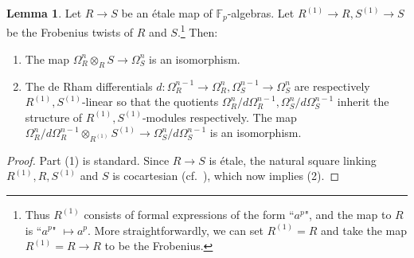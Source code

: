 \documentclass{amsart}
\theoremstyle{definition}
\newtheorem{lemma}[definition]{Lemma}
\begin{document}
\begin{lemma} 
Let $R \to S$ be an \'etale map of $\mathbb{F}_p$-algebras. 
Let $R^{(1)} \rightarrow R, S^{(1)} \rightarrow S$ be the Frobenius twists of $R$ and $S$.\footnote{Thus $R^{(1)}$ consists of formal expressions of the form ``$a^p$", and the map to $R$ is ``$a^p$" $\mapsto a^p$.  More straightforwardly, we can set $R^{(1)}=R$ and take the map $R^{(1)}=R\rightarrow R$ to be the Frobenius.}
Then: 
\begin{enumerate}
\item The map $\Omega^n_R \otimes_R S \to \Omega^n_S$ is an isomorphism.  
\item The 
de Rham differentials $d: \Omega^{n-1}_R \to \Omega^n_R, \Omega^{n-1}_S \to
\Omega^n_S$ are respectively $R^{(1)}, S^{(1)}$-linear so that the quotients 
$\Omega^n_R/d \Omega_R^{n-1} , \Omega^n_S/d \Omega_S^{n-1} $ inherit the
structure of $R^{(1)}, S^{(1)}$-modules respectively.
The 
map $\Omega^n_R/d \Omega_R^{n-1} \otimes_{R^{(1)}} S^{(1)} \to
\Omega^n_S/d\Omega^{n-1}_S$ is an isomorphism. 
\end{enumerate}
\label{qcohomega}
\end{lemma} 
\begin{proof} 
Part (1) is standard. Since $R \to S$ is \'etale, the natural square linking
$R^{(1)}, R, S^{(1)}$ and $S$ is cocartesian (cf.~\cite[Tag
0EBS]{stacks-project}), which now implies
(2). 
\end{proof} 
\end{document}
